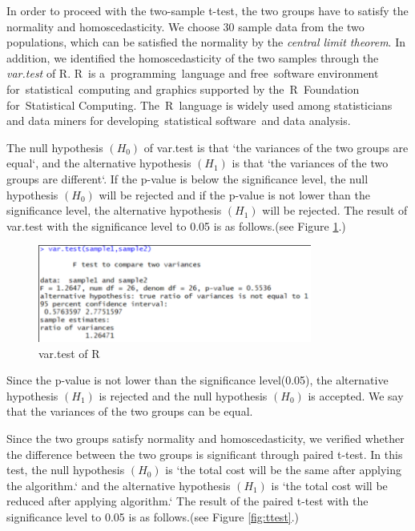 In order to proceed with the two-sample t-test, the two groups have to satisfy the normality and homoscedasticity. We choose $30$ sample data from the two populations, which can be satisfied the normality by the {\it central limit theorem}.
In addition, we identified the homoscedasticity of the two samples through the {\it var.test} of R. 
R is a programming language and free software environment for statistical computing and graphics supported by the R Foundation for Statistical Computing. The R language is widely used among statisticians and data miners for developing statistical software and data analysis.



The null hypothesis $(H_{0})$ of var.test is that `the variances of the two groups are equal`, and the alternative hypothesis $(H_{1})$ is that `the variances of the two groups are different`. 
If the p-value is below the significance level, the null hypothesis $(H_{0})$ will be rejected and if the p-value is not lower than the significance level, the alternative hypothesis $(H_{1})$ will be rejected.  The result of var.test with the significance level to 0.05 is as follows.(see Figure \ref{fig:vartest}.)

\begin{figure}[h!]
	\centering
	\includegraphics[width=9cm]{vartest.pdf}
	\caption{var.test of R}
	\label{fig:vartest}       %
\end{figure}

Since the p-value is not lower than the significance level(0.05), the alternative hypothesis $(H_{1})$ is rejected and the null hypothesis $(H_{0})$ is accepted. 
We say that the variances of the two groups can be equal.

Since the two groups satisfy normality and homoscedasticity, we verified whether the difference between the two groups is significant through paired t-test. In this test, the null hypothesis $(H_{0})$ is `the total cost will be the same after applying the algorithm.` and the alternative hypothesis $(H_{1})$ is `the total cost will be reduced after applying algorithm.` The result of the paired t-test with the significance level to 0.05 is as follows.(see Figure \ref{fig:ttest}.)


